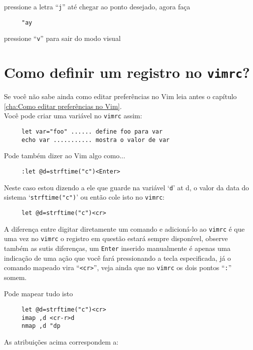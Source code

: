 pressione a letra ``\verb|j|'' até chegar ao ponto desejado, agora faça

\begin{verbatim}
     "ay
\end{verbatim}

pressione ``\verb|v|'' para sair do modo visual

\section{Como definir um registro no {\tt vimrc}?}
\label{Como definir um registro no vimrc?}

Se você não sabe ainda como editar preferências no Vim
leia antes o capítulo \ref{cha:Como editar preferências no Vim}. \\


Você pode criar uma variável no {\tt vimrc} assim:

\begin{verbatim}
     let var="foo" ...... define foo para var
     echo var ........... mostra o valor de var
\end{verbatim}

Pode também dizer ao Vim algo como...

\begin{verbatim}
     :let @d=strftime("c")<Enter>
\end{verbatim}

Neste caso estou dizendo a ele que guarde na variável `{\tt d}' at d,
o valor da data do sistema `{\tt strftime("c")}' ou então cole isto no
{\tt vimrc}:

\begin{verbatim}
     let @d=strftime("c")<cr>
\end{verbatim}

A diferença entre digitar diretamente um comando e adicioná-lo ao
{\tt vimrc} é que uma vez no {\tt vimrc} o registro em questão estará sempre
disponível, observe também as sutis diferenças, um {\tt Enter} inserido
manualmente é apenas uma indicação de uma ação que você fará
pressionando a tecla especificada, já o comando mapeado vira
``\verb|<cr>|'', veja ainda que no {\tt vimrc} os dois pontos ``\verb|:|''
somem.

Pode mapear tudo isto

\begin{verbatim}
     let @d=strftime("c")<cr>
     imap ,d <cr-r>d
     nmap ,d "dp
\end{verbatim}

As atribuições acima correspondem a:

